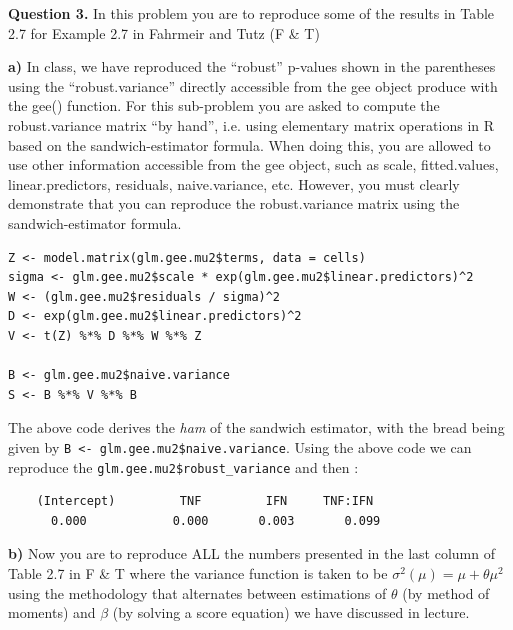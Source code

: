 \documentclass{article}
\newcommand\questionbox[1]{%
  \begin{Qbox}#1\end{Qbox}}
\begin{document}
\newpage

\questionbox{\textbf{Question 3.} In this problem you are to reproduce some of the results in Table 2.7 for Example 2.7 in Fahrmeir and Tutz (F \& T)
}
\questionbox{\textbf{a)} In class, we have reproduced the “robust” p-values shown in the parentheses using the “robust.variance” directly accessible from the gee object produce with the gee() function. For this sub-problem you are asked to compute the robust.variance matrix “by hand”, i.e. using elementary matrix operations in R based on the sandwich-estimator formula. When doing this, you are allowed to use other information accessible from the gee object, such as scale, fitted.values, linear.predictors, residuals, naive.variance, etc. However, you must clearly demonstrate that you can reproduce the robust.variance matrix using the sandwich-estimator formula.}

\begin{verbatim}
Z <- model.matrix(glm.gee.mu2$terms, data = cells)
sigma <- glm.gee.mu2$scale * exp(glm.gee.mu2$linear.predictors)^2
W <- (glm.gee.mu2$residuals / sigma)^2
D <- exp(glm.gee.mu2$linear.predictors)^2
V <- t(Z) %*% D %*% W %*% Z

B <- glm.gee.mu2$naive.variance
S <- B %*% V %*% B
\end{verbatim}
The above code derives the \textit{ham} of the sandwich estimator, with the bread being given by \texttt{B <- glm.gee.mu2\$naive.variance}. Using the above code we can reproduce the \texttt{glm.gee.mu2\$robust\_variance} and then :

\begin{verbatim}
    (Intercept)         TNF         IFN     TNF:IFN 
      0.000            0.000       0.003       0.099 
\end{verbatim}

\questionbox{\textbf{b)} Now you are to reproduce ALL the numbers presented in the last column of Table 2.7 in F \& T where the variance function is taken to be $\sigma^2(\mu) = \mu+\theta\mu^2$ using the methodology that alternates between estimations of $\theta$ (by method of moments) and $\beta$ (by solving a score equation) we have discussed in lecture.}
\end{document}
